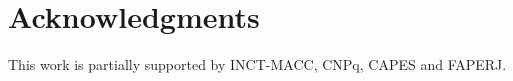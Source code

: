 \section{Acknowledgments}\label{acknowledgment}
This work is partially supported by INCT-MACC, CNPq, CAPES and FAPERJ.
